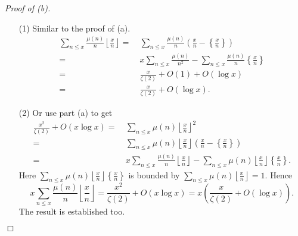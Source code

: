 \documentclass{article}
\begin{document}
\emph{Proof of (b).}
\begin{enumerate}
\item[(1)]
  Similar to the proof of (a).
  \begin{align*}
    \sum_{n \leq x} \frac{\mu(n)}{n} \left\lfloor \frac{x}{n} \right\rfloor
    = & \:
    \sum_{n \leq x} \frac{\mu(n)}{n} \left( \frac{x}{n} - \left\{\frac{x}{n}\right\} \right) \\
    = & \:
    x \sum_{n \leq x} \frac{\mu(n)}{n^2}
        - \sum_{n \leq x} \frac{\mu(n)}{n}\left\{\frac{x}{n}\right\} \\
    = & \:
    \frac{x}{\zeta(2)} + O(1) + O(\log x) \\
    = & \:
    \frac{x}{\zeta(2)} + O(\log x).    
  \end{align*}

\item[(2)]
  Or use part (a) to get
  \begin{align*}
    \frac{x^2}{\zeta(2)} + O(x \log x)
    = & \:
    \sum_{n \leq x} \mu(n) \left\lfloor \frac{x}{n} \right\rfloor^2 \\
    = & \:
    \sum_{n \leq x} \mu(n)\left\lfloor \frac{x}{n} \right\rfloor
        \left( \frac{x}{n} - \left\{\frac{x}{n}\right\} \right) \\
    = & \:
    x \sum_{n \leq x} \frac{\mu(n)}{n} \left\lfloor \frac{x}{n} \right\rfloor
        - \sum_{n \leq x} \mu(n) \left\lfloor \frac{x}{n} \right\rfloor \left\{\frac{x}{n}\right\}.
  \end{align*}
  Here
  $\sum_{n \leq x} \mu(n) \left\lfloor \frac{x}{n} \right\rfloor \left\{\frac{x}{n}\right\}$
  is bounded by
  $\sum_{n \leq x} \mu(n) \left\lfloor \frac{x}{n} \right\rfloor = 1$.
  Hence
  \[
    x \sum_{n \leq x} \frac{\mu(n)}{n} \left\lfloor \frac{x}{n} \right\rfloor
    = \frac{x^2}{\zeta(2)} + O(x \log x)
    = x \left( \frac{x}{\zeta(2)} + O(\log x) \right).
  \]
  The result is established too.
\end{enumerate}
$\Box$ \\\\



\end{document}
